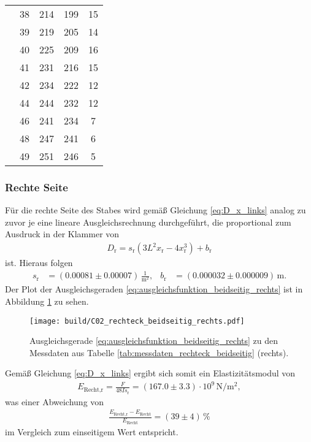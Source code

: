 \begin{table}[H]
\begin{tabular}[]{S S[table-format = 2.0] S S S[table-format = 2.0]}
                 & 38 & 214 & 199 & 15 \\
                 & 39 & 219 & 205 & 14 \\
                 & 40 & 225 & 209 & 16 \\
                 & 41 & 231 & 216 & 15 \\
                 & 42 & 234 & 222 & 12 \\
                 & 44 & 244 & 232 & 12 \\
                 & 46 & 241 & 234 &  7 \\
                 & 48 & 247 & 241 &  6 \\
                 & 49 & 251 & 246 &  5 \\
        \bottomrule
    \end{tabular}
\end{table}

\subsubsection{Rechte Seite}
Für die rechte Seite des Stabes wird gemäß Gleichung \eqref{eq:D_x_links} analog zu zuvor je eine lineare Ausgleichsrechnung durchgeführt,
die proportional zum Ausdruck in der Klammer von
\begin{align}
    D_\text{r} = s_\text{r} \left(3 L^2 x_\text{r} - 4 x_\text{r}^3\right) + b_\text{r}
    \label{eq:ausgleichsfunktion_beidseitig_rechts}
\end{align}
ist.
Hieraus folgen 
\begin{align*}
    s_\text{r} &= (\num{0.00081} \pm \num{0.00007}) \, \frac{1}{\unit{\meter^2}}, & 
    b_\text{r} &= (\num{0.000032} \pm \num{0.000009}) \, \unit{\meter}.
\end{align*}
Der Plot der Ausgleichsgeraden \eqref{eq:ausgleichsfunktion_beidseitig_rechts} ist in Abbildung \ref{fig:plot_rechteck_beidseitig_rechts}
zu sehen.
%
\begin{figure}[H]
    \centering
    \texttt{[image: build/C02\_rechteck\_beidseitig\_rechts.pdf]}
    \caption{Ausgleichsgerade \eqref{eq:ausgleichsfunktion_beidseitig_rechts} zu den Messdaten aus Tabelle \ref{tab:messdaten_rechteck_beidseitig} (rechts).}
    \label{fig:plot_rechteck_beidseitig_rechts}
\end{figure}

\noindent
Gemäß Gleichung \eqref{eq:D_x_links} ergibt sich somit ein Elastizitätsmodul von 
\begin{align}
    E_\text{Recht,r} = \frac{F}{48 I s_\text{r}} = (\num{167.0} \pm \num{3.3}) \cdot 10^9 \, \unit{\newton\per\meter^2},
\end{align}
was einer Abweichung von 
\begin{align*}
    \frac{E_\text{Recht,r} - E_\text{Recht}}{E_\text{Recht}} = (\num{39} \pm \num{4}) \, \%
\end{align*}
im Vergleich zum einseitigem Wert entspricht.




